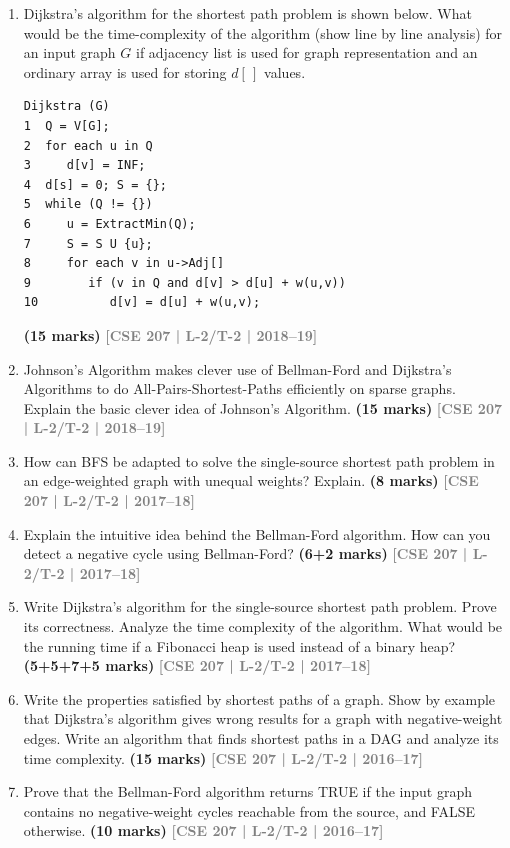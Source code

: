 \documentclass[12pt]{article}
\newcommand{\yr}[1]{\hfill\textcolor{gray}{\small\textbf{[#1]}}}
\newcommand{\mk}[1]{\textcolor{orange!70!black}{\small\textbf{(#1 marks)}}}
\begin{document}
\begin{enumerate}
\item Dijkstra's algorithm for the shortest path problem is shown below. What would be the time-complexity of the algorithm (show line by line analysis) for an input graph $G$ if adjacency list is used for graph representation and an ordinary array is used for storing $d[\,]$ values.
 
\begin{lstlisting}
Dijkstra (G)
1  Q = V[G];
2  for each u in Q
3     d[v] = INF;
4  d[s] = 0; S = {};
5  while (Q != {})
6     u = ExtractMin(Q);
7     S = S U {u};
8     for each v in u->Adj[]
9        if (v in Q and d[v] > d[u] + w(u,v))
10          d[v] = d[u] + w(u,v);
\end{lstlisting}
\mk{15} \yr{CSE 207 | L-2/T-2 | 2018--19}


\item Johnson's Algorithm makes clever use of Bellman-Ford and Dijkstra's Algorithms to do All-Pairs-Shortest-Paths efficiently on sparse graphs. Explain the basic clever idea of Johnson's Algorithm.
\mk{15} \yr{CSE 207 | L-2/T-2 | 2018--19}


\item How can BFS be adapted to solve the single-source shortest path problem in an edge-weighted graph with unequal weights? Explain. 
\mk{8} \yr{CSE 207 | L-2/T-2 | 2017--18}


\item Explain the intuitive idea behind the Bellman-Ford algorithm. How can you detect a negative cycle using Bellman-Ford? \mk{6+2}
\yr{CSE 207 | L-2/T-2 | 2017--18}


\item Write Dijkstra's algorithm for the single-source shortest path problem. Prove its correctness. Analyze the time complexity of the algorithm. What would be the running time if a Fibonacci heap is used instead of a binary heap? \mk{5+5+7+5}
\yr{CSE 207 | L-2/T-2 | 2017--18}


\item Write the properties satisfied by shortest paths of a graph. Show by example that Dijkstra's algorithm gives wrong results for a graph with negative-weight edges. Write an algorithm that finds shortest paths in a DAG and analyze its time complexity. \mk{15}
\yr{CSE 207 | L-2/T-2 | 2016--17}


\item Prove that the Bellman-Ford algorithm returns TRUE if the input graph contains no negative-weight cycles reachable from the source, and FALSE otherwise. \mk{10}
\yr{CSE 207 | L-2/T-2 | 2016--17}



\end{enumerate}
\end{document}

